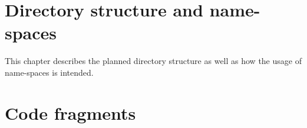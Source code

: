 \documentclass[
    a4paper,      %
    10pt,         %
    openright,    %
    notitlepage,  %
    parskip=half, %
]{scrreprt}       %
\theoremstyle{definition}                    %
\begin{document}
\section{Directory structure and name-spaces}
\label{sec:directory-structure}

This chapter describes the planned directory structure as well as how the usage
of name-spaces is intended.

% 
% 
% 
% 

\section{Code fragments}
\label{sec:code-fragments}
\end{document}

